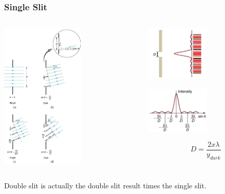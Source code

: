 \documentclass{beamer}
\begin{document}
\begin{frame}\frametitle{Single Slit}
\begin{columns}
\begin{column}{5cm}
\begin{center}
\includegraphics[height=7cm]{fig/sl2.jpg}
\end{center}


\end{column}
\begin{column}{6cm}
\begin{center}
\includegraphics[width=3cm]{fig/sl1.jpg}

\includegraphics[width=3cm]{fig/sl3.jpg}
\end{center}
\[D = \frac{2 x \lambda}{y_{dark}}\]
\end{column}
\end{columns}
Double slit is actually the double slit result times the single slit.
\end{frame}
\end{document}
